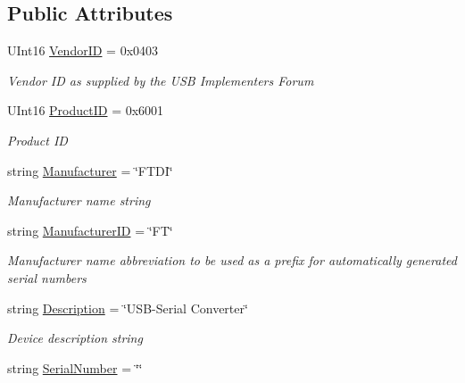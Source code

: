 \subsection*{Public Attributes}
\begin{DoxyCompactItemize}
\item 
U\+Int16 \mbox{\hyperlink{class_f_t_d2_x_x___n_e_t_1_1_f_t_d_i_1_1_f_t___e_e_p_r_o_m___d_a_t_a_a17127baadd5b6ace9925935ddb9e8121}{Vendor\+ID}} = 0x0403
\begin{DoxyCompactList}\small\item\em Vendor ID as supplied by the U\+SB Implementers Forum \end{DoxyCompactList}\item 
U\+Int16 \mbox{\hyperlink{class_f_t_d2_x_x___n_e_t_1_1_f_t_d_i_1_1_f_t___e_e_p_r_o_m___d_a_t_a_ad40466a835fa9d930bdbace2e1c3bb0e}{Product\+ID}} = 0x6001
\begin{DoxyCompactList}\small\item\em Product ID \end{DoxyCompactList}\item 
string \mbox{\hyperlink{class_f_t_d2_x_x___n_e_t_1_1_f_t_d_i_1_1_f_t___e_e_p_r_o_m___d_a_t_a_a7e95a958cac94bf9b5bb4c7e2b6a8f0f}{Manufacturer}} = \char`\"{}F\+T\+DI\char`\"{}
\begin{DoxyCompactList}\small\item\em Manufacturer name string \end{DoxyCompactList}\item 
string \mbox{\hyperlink{class_f_t_d2_x_x___n_e_t_1_1_f_t_d_i_1_1_f_t___e_e_p_r_o_m___d_a_t_a_a1c4e29b35ff00c13ef63f52780b3a15a}{Manufacturer\+ID}} = \char`\"{}FT\char`\"{}
\begin{DoxyCompactList}\small\item\em Manufacturer name abbreviation to be used as a prefix for automatically generated serial numbers \end{DoxyCompactList}\item 
string \mbox{\hyperlink{class_f_t_d2_x_x___n_e_t_1_1_f_t_d_i_1_1_f_t___e_e_p_r_o_m___d_a_t_a_a2f722cb9e18cf1bf637db4de7477508f}{Description}} = \char`\"{}U\+SB-\/Serial Converter\char`\"{}
\begin{DoxyCompactList}\small\item\em Device description string \end{DoxyCompactList}\item 
string \mbox{\hyperlink{class_f_t_d2_x_x___n_e_t_1_1_f_t_d_i_1_1_f_t___e_e_p_r_o_m___d_a_t_a_a2ed136a3f83be9a3a3cf3249f146b1b0}{Serial\+Number}} = \char`\"{}\char`\"{}

\end{DoxyCompactItemize}
